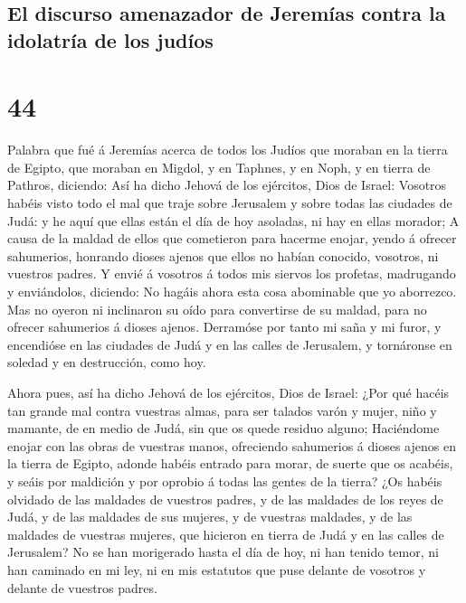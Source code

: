 \hypertarget{el-discurso-amenazador-de-jeremuxedas-contra-la-idolatruxeda-de-los-juduxedos}{%
\subsection{El discurso amenazador de Jeremías contra la idolatría de
los
judíos}\label{el-discurso-amenazador-de-jeremuxedas-contra-la-idolatruxeda-de-los-juduxedos}}

\hypertarget{section-24-44}{%
\section{44}\label{section-24-44}}

 Palabra que fué á Jeremías acerca de todos los Judíos que
moraban en la tierra de Egipto, que moraban en Migdol, y en Taphnes, y
en Noph, y en tierra de Pathros, diciendo:  Así ha dicho
Jehová de los ejércitos, Dios de Israel: Vosotros habéis visto todo el
mal que traje sobre Jerusalem y sobre todas las ciudades de Judá: y he
aquí que ellas están el día de hoy asoladas, ni hay en ellas morador;
 A causa de la maldad de ellos que cometieron para hacerme
enojar, yendo á ofrecer sahumerios, honrando dioses ajenos que ellos no
habían conocido, vosotros, ni vuestros padres.  Y envié á
vosotros á todos mis siervos los profetas, madrugando y enviándolos,
diciendo: No hagáis ahora esta cosa abominable que yo aborrezco.
 Mas no oyeron ni inclinaron su oído para convertirse de
su maldad, para no ofrecer sahumerios á dioses ajenos. 
Derramóse por tanto mi saña y mi furor, y encendióse en las ciudades de
Judá y en las calles de Jerusalem, y tornáronse en soledad y en
destrucción, como hoy.

 Ahora pues, así ha dicho Jehová de los ejércitos, Dios de
Israel: ¿Por qué hacéis tan grande mal contra vuestras almas, para ser
talados varón y mujer, niño y mamante, de en medio de Judá, sin que os
quede residuo alguno;  Haciéndome enojar con las obras de
vuestras manos, ofreciendo sahumerios á dioses ajenos en la tierra de
Egipto, adonde habéis entrado para morar, de suerte que os acabéis, y
seáis por maldición y por oprobio á todas las gentes de la tierra?
 ¿Os habéis olvidado de las maldades de vuestros padres, y
de las maldades de los reyes de Judá, y de las maldades de sus mujeres,
y de vuestras maldades, y de las maldades de vuestras mujeres, que
hicieron en tierra de Judá y en las calles de Jerusalem? 
No se han morigerado hasta el día de hoy, ni han tenido temor, ni han
caminado en mi ley, ni en mis estatutos que puse delante de vosotros y
delante de vuestros padres.

